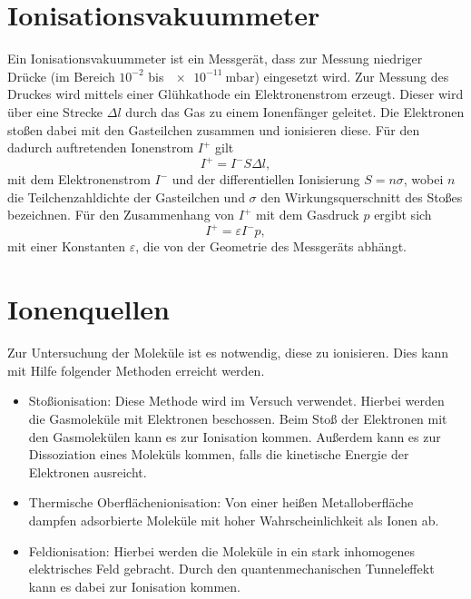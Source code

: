 \section{Ionisationsvakuummeter}

Ein Ionisationsvakuummeter ist ein Messgerät, dass zur Messung niedriger Drücke (im Bereich $10^{-2}$ bis $\SI{e-11}{\milli\bar}$) eingesetzt wird. Zur Messung des Druckes wird mittels einer Glühkathode ein Elektronenstrom erzeugt. Dieser wird über eine Strecke $\Delta l$ durch das Gas zu einem Ionenfänger geleitet.
Die Elektronen stoßen dabei mit den Gasteilchen zusammen und ionisieren diese. Für den dadurch auftretenden Ionenstrom $I^{+}$ gilt
\begin{equation}
 I^{+} = I^{-}S\Delta l,
\end{equation}
mit dem Elektronenstrom $I^{-}$ und der differentiellen Ionisierung $S=n\sigma$, wobei $n$ die Teilchenzahldichte der Gasteilchen und $\sigma$ den Wirkungsquerschnitt des Stoßes bezeichnen.
Für den Zusammenhang von $I^{+}$ mit dem Gasdruck $p$ ergibt sich
\begin{equation}
 I^{+} = \varepsilon I^{-}p,
\end{equation}
mit einer Konstanten $\varepsilon$, die von der Geometrie des Messgeräts abhängt.

\section{Ionenquellen}

Zur Untersuchung der Moleküle ist es notwendig, diese zu ionisieren. Dies kann mit Hilfe folgender Methoden erreicht werden.
\begin{itemize}
 \item Stoßionisation: Diese Methode wird im Versuch verwendet. Hierbei werden die Gasmoleküle mit Elektronen beschossen. Beim Stoß der Elektronen mit den Gasmolekülen kann es zur Ionisation kommen.
 Außerdem kann es zur Dissoziation eines Moleküls kommen, falls die kinetische Energie der Elektronen ausreicht.
 \item Thermische Oberflächenionisation: Von einer heißen Metalloberfläche dampfen adsorbierte Moleküle mit hoher Wahrscheinlichkeit als Ionen ab.
 \item Feldionisation: Hierbei werden die Moleküle in ein stark inhomogenes elektrisches Feld gebracht. Durch den quantenmechanischen Tunneleffekt kann es dabei zur Ionisation kommen.
\end{itemize}


